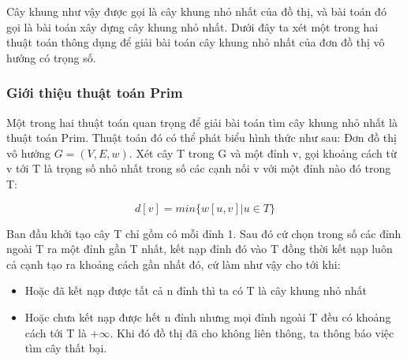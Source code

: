 \documentclass[a4paper,10pt]{article}
\begin{document}
Cây khung như vậy được gọi là cây khung nhỏ nhất của đồ thị, và bài toán đó gọi là bài toán xây dựng cây khung nhỏ nhất. Dưới đây ta xét một trong hai thuật toán thông dụng để giải bài toán cây khung nhỏ nhất của đơn đồ thị vô hướng có trọng số.
\subsubsection{Giới thiệu thuật toán Prim}
Một trong hai thuật toán quan trọng để giải bài toán tìm cây khung nhỏ nhất là thuật toán Prim. Thuật toán đó có thể phát biểu hình thức như sau:
Đơn đồ thị vô hướng $G = (V, E, w)$. Xét cây T trong G và một đỉnh v, gọi khoảng cách từ v tới T là trọng số nhỏ nhất trong số các cạnh nối v với một đỉnh nào đó trong T:

$$d[v] = min\{w[u,v] | u\in T\}$$

Ban đầu khởi tạo cây T chỉ gồm có mỗi đỉnh {1}. Sau đó cứ chọn trong số các đỉnh ngoài T ra một đỉnh gần T nhất, kết nạp đỉnh đó vào T đồng thời kết nạp luôn cả cạnh tạo ra khoảng cách gần nhất đó, cứ làm như vậy cho tới khi:
\begin{itemize}
\item Hoặc đã kết nạp được tất cả n đỉnh thì ta có T là cây khung nhỏ nhất
\item Hoặc chưa kết nạp được hết n đỉnh nhưng mọi đỉnh ngoài T đều có khoảng cách tới T là $+\infty$. Khi đó đồ thị đã cho không liên thông, ta thông báo việc tìm cây thất bại.
\end{itemize}
\end{document}
